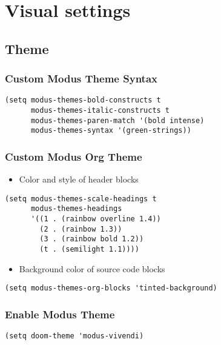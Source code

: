 \documentclass[11pt]{article}
\begin{document}
\section{Visual settings}
\label{sec:orgc136596}

\subsection{Theme}
\label{sec:org66edb66}

\subsubsection{Custom Modus Theme Syntax}
\label{sec:orgdf6f7cb}

\begin{verbatim}
(setq modus-themes-bold-constructs t
      modus-themes-italic-constructs t
      modus-themes-paren-match '(bold intense)
      modus-themes-syntax '(green-strings))
\end{verbatim}
\subsubsection{Custom Modus Org Theme}
\label{sec:orge3fe7d5}

\begin{itemize}
\item Color and style of header blocks
\end{itemize}
\begin{verbatim}
(setq modus-themes-scale-headings t
      modus-themes-headings
      '((1 . (rainbow overline 1.4))
        (2 . (rainbow 1.3))
        (3 . (rainbow bold 1.2))
        (t . (semilight 1.1))))
\end{verbatim}

\begin{itemize}
\item Background color of source code blocks
\end{itemize}
\begin{verbatim}
(setq modus-themes-org-blocks 'tinted-background)
\end{verbatim}
\subsubsection{Enable Modus Theme}
\label{sec:org2e2a7c8}
\begin{verbatim}
(setq doom-theme 'modus-vivendi)
\end{verbatim}
\end{document}
